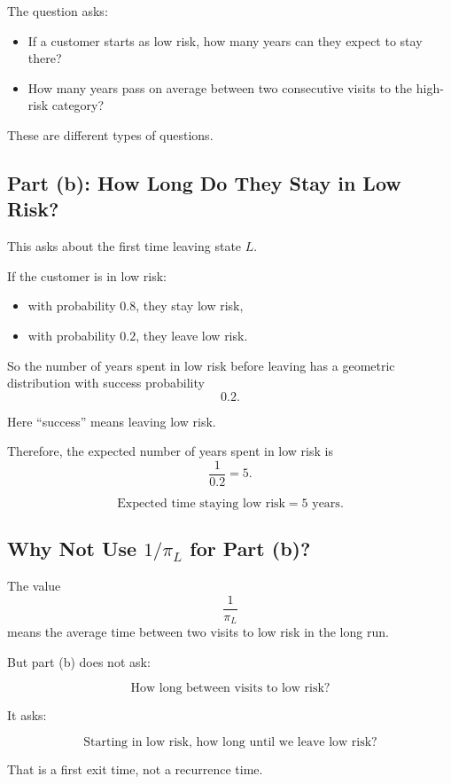 \documentclass[12pt,a4paper]{article}
\theoremstyle{notestyle}
\begin{document}
The question asks:

\begin{itemize}[leftmargin=1.2cm]
    \item[(b)] If a customer starts as low risk, how many years can they expect to stay there?
    \item[(c)] How many years pass on average between two consecutive visits to the high-risk category?
\end{itemize}

These are different types of questions.

\subsection{Part (b): How Long Do They Stay in Low Risk?}

This asks about the first time leaving state $L$.

If the customer is in low risk:
\begin{itemize}[leftmargin=1.2cm]
    \item with probability $0.8$, they stay low risk,
    \item with probability $0.2$, they leave low risk.
\end{itemize}

So the number of years spent in low risk before leaving has a geometric distribution with success probability
\[
0.2.
\]

Here ``success'' means leaving low risk.

Therefore, the expected number of years spent in low risk is
\[
\frac{1}{0.2}=5.
\]

\[
\boxed{\text{Expected time staying low risk}=5\text{ years}.}
\]

\subsection{Why Not Use $1/\pi_L$ for Part (b)?}

The value
\[
\frac1{\pi_L}
\]
means the average time between two visits to low risk in the long run.

But part (b) does not ask:

\[
\text{How long between visits to low risk?}
\]

It asks:

\[
\text{Starting in low risk, how long until we leave low risk?}
\]

That is a first exit time, not a recurrence time.
\end{document}
